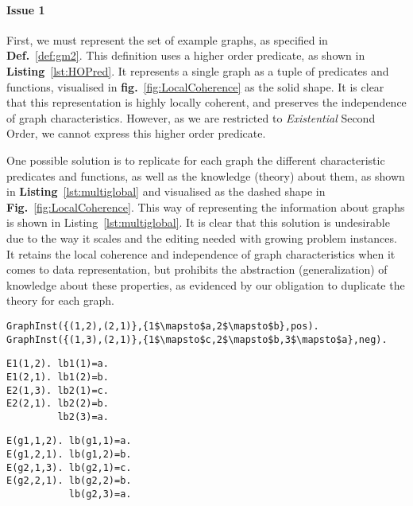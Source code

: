 \paragraph{Issue 1}
First, we must represent the set of example graphs, as specified in \textbf{Def.}~\ref{def:gm2}. 
This definition uses a higher order predicate, as shown in \textbf{Listing}~\ref{lst:HOPred}. 
It represents a single graph as a tuple of predicates and functions, visualised in \textbf{fig.}~\ref{fig:LocalCoherence} as the solid shape.
It is clear that this representation is highly locally coherent, and preserves the independence of graph characteristics.
However, as we are restricted to \emph{Existential} Second Order, we cannot express this higher order predicate.

One possible solution is to replicate for each graph the different characteristic predicates and functions, as well as the knowledge (theory) about them, as shown
in \textbf{Listing}~\ref{lst:multiglobal} and visualised as the dashed shape in \textbf{Fig.}~\ref{fig:LocalCoherence}.
This way of representing the information about graphs is shown in Listing~\ref{lst:multiglobal}.
It is clear that this solution is undesirable due to the way it scales and the editing needed with growing problem instances.
It retains the local coherence and independence of graph characteristics when it comes to data representation, but prohibits the abstraction (generalization) of knowledge about these properties, as evidenced by our obligation to duplicate the theory for each graph.

\begin{lstlisting}[mathescape,caption=Higher order predicate modeling the set $\graphset{G}$ of Def~\ref{def:gm2}.,label=lst:HOPred]
GraphInst({(1,2),(2,1)},{1$\mapsto$a,2$\mapsto$b},pos).
GraphInst({(1,3),(2,1)},{1$\mapsto$c,2$\mapsto$b,3$\mapsto$a},neg).
\end{lstlisting}
\begin{minipage}[t]{0.5\linewidth}
\begin{lstlisting}[mathescape,caption=Multiple global relations,label=lst:multiglobal]
E1(1,2). lb1(1)=a.
E1(2,1). lb1(2)=b.
E2(1,3). lb2(1)=c.
E2(2,1). lb2(2)=b.
         lb2(3)=a.
\end{lstlisting}
\end{minipage}
\begin{minipage}[t]{0.5\linewidth}
\begin{lstlisting}[mathescape,caption=Disjoint union using indexed global relations,label=lst:indexedglobal]
E(g1,1,2). lb(g1,1)=a.
E(g1,2,1). lb(g1,2)=b.
E(g2,1,3). lb(g2,1)=c.
E(g2,2,1). lb(g2,2)=b.
           lb(g2,3)=a.
\end{lstlisting}
\end{minipage}




